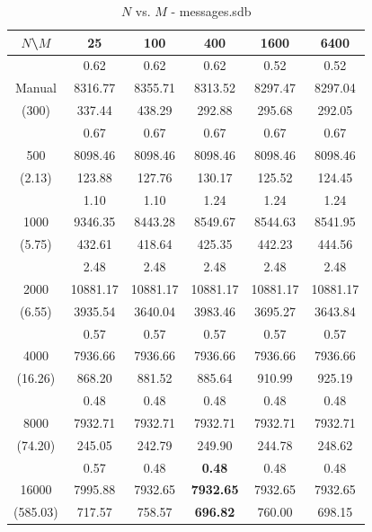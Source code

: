 \begin{table}[th]
\caption{$N$ vs. $M$ - messages.sdb}
\label{tab:messages.sdb}
\centering
\begin{tabular}{|c||c|c|c|c|c|}
\hline
$N$\textbackslash $M$& 25 & 100 & 400 & 1600 & 6400 \\ \hline \hline
       & 0.62    & 0.62    & 0.62    & 0.52    & 0.52  \\ 
Manual & 8316.77 & 8355.71 & 8313.52 & 8297.47 & 8297.04 \\
(300) & 337.44  & 438.29  & 292.88  & 295.68  & 292.05 \\\hline
  & 0.67 & 0.67 & 0.67 & 0.67 & 0.67\\
500  & 8098.46 & 8098.46 & 8098.46 & 8098.46 & 8098.46\\ 
(2.13)  & 123.88 & 127.76 & 130.17 & 125.52 & 124.45\\ \hline 
  & 1.10 & 1.10 & 1.24 & 1.24 & 1.24\\ 
1000  & 9346.35 & 8443.28 & 8549.67 & 8544.63 & 8541.95\\ 
(5.75)  & 432.61 & 418.64 & 425.35 & 442.23 & 444.56\\ \hline 
  & 2.48 & 2.48 & 2.48 & 2.48 & 2.48\\ 
2000  & 10881.17 & 10881.17 & 10881.17 & 10881.17 & 10881.17\\ 
(6.55)  & 3935.54 & 3640.04 & 3983.46 & 3695.27 & 3643.84\\ \hline 
  & 0.57 & 0.57 & 0.57 & 0.57 & 0.57\\ 
4000  & 7936.66 & 7936.66 & 7936.66 & 7936.66 & 7936.66\\ 
(16.26)  & 868.20 & 881.52 & 885.64 & 910.99 & 925.19\\ \hline 
  & 0.48 & 0.48 & 0.48 & 0.48 & 0.48\\ 
8000  & 7932.71 & 7932.71 & 7932.71 & 7932.71 & 7932.71\\ 
(74.20)  & 245.05 & 242.79 & 249.90 & 244.78 & 248.62\\ \hline 
  & 0.57 & 0.48 & {\bf 0.48} & 0.48 & 0.48\\ 
16000  & 7995.88 & 7932.65 & {\bf 7932.65} & 7932.65 & 7932.65\\ 
(585.03)  & 717.57 & 758.57 & {\bf 696.82} & 760.00 & 698.15\\ \hline 
\end{tabular}
\end{table}


